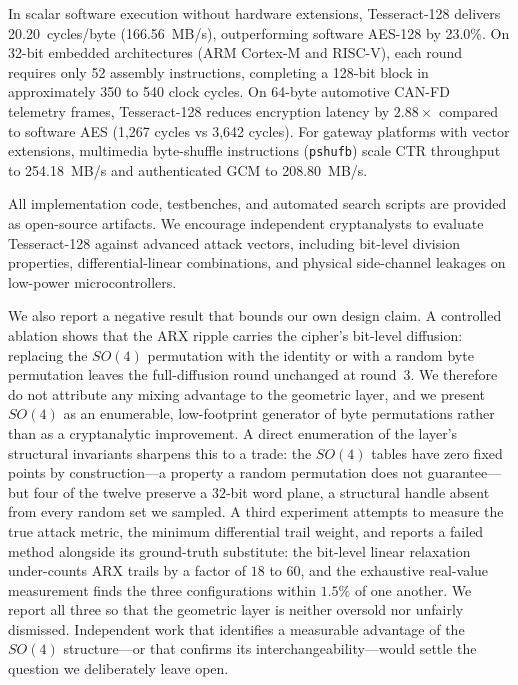\documentclass[10pt,twocolumn]{article}
\begin{document}
In scalar software execution without hardware extensions, Tesseract-128 delivers 20.20~cycles/byte (166.56~MB/s), outperforming software AES-128 by 23.0\%. On 32-bit embedded architectures (ARM Cortex-M and RISC-V), each round requires only 52 assembly instructions, completing a 128-bit block in approximately 350 to 540 clock cycles. On 64-byte automotive CAN-FD telemetry frames, Tesseract-128 reduces encryption latency by $2.88\times$ compared to software AES (1,267 cycles vs 3,642 cycles). For gateway platforms with vector extensions, multimedia byte-shuffle instructions (\texttt{pshufb}) scale CTR throughput to 254.18~MB/s and authenticated GCM to 208.80~MB/s.

All implementation code, testbenches, and automated search scripts are provided as open-source artifacts. We encourage independent cryptanalysts to evaluate Tesseract-128 against advanced attack vectors, including bit-level division properties, differential-linear combinations, and physical side-channel leakages on low-power microcontrollers.

We also report a negative result that bounds our own design claim. A controlled ablation shows that the ARX ripple carries the cipher's bit-level diffusion: replacing the $SO(4)$ permutation with the identity or with a random byte permutation leaves the full-diffusion round unchanged at round~3. We therefore do not attribute any mixing advantage to the geometric layer, and we present $SO(4)$ as an enumerable, low-footprint generator of byte permutations rather than as a cryptanalytic improvement. A direct enumeration of the layer's structural invariants sharpens this to a trade: the $SO(4)$ tables have zero fixed points by construction---a property a random permutation does not guarantee---but four of the twelve preserve a $32$-bit word plane, a structural handle absent from every random set we sampled. A third experiment attempts to measure the true attack metric, the minimum differential trail weight, and reports a failed method alongside its ground-truth substitute: the bit-level linear relaxation under-counts ARX trails by a factor of $18$ to $60$, and the exhaustive real-value measurement finds the three configurations within $1.5\%$ of one another. We report all three so that the geometric layer is neither oversold nor unfairly dismissed. Independent work that identifies a measurable advantage of the $SO(4)$ structure---or that confirms its interchangeability---would settle the question we deliberately leave open.
\end{document}
